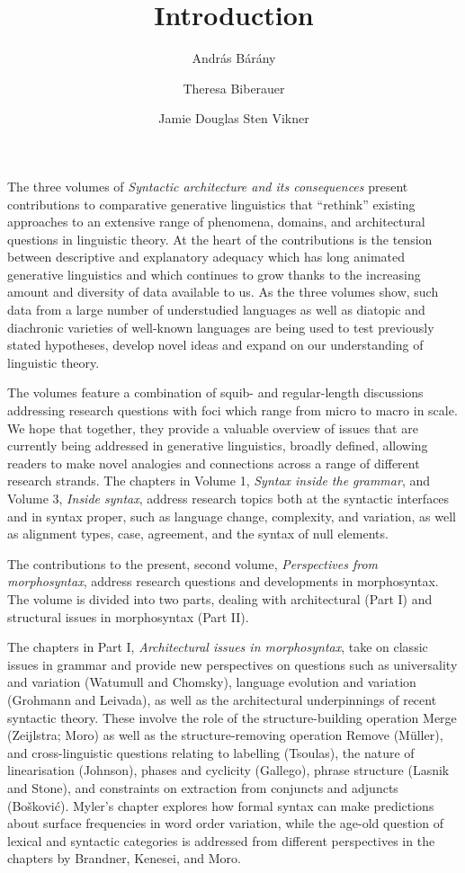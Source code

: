\documentclass[output=paper]{langsci/langscibook}
\author{András Bárány\affiliation{Bielefeld University}\and
        Theresa Biberauer\affiliation{University of Cambridge, Stellenbosch
        University, University of the West Cape}\and
        Jamie Douglas\affiliation{University of Cambridge}\lastand
        Sten Vikner\affiliation{Aarhus University}}
\title{Introduction}
\begin{document}
\maketitle

\noindent The three volumes of \emph{Syntactic architecture and its
consequences} present contributions to comparative generative linguistics that
\enquote{rethink} existing approaches to an extensive range of phenomena,
domains, and architectural questions in linguistic theory. At the heart of the
contributions is the tension between descriptive and explanatory adequacy which
has long animated generative linguistics and which continues to grow thanks to
the increasing amount and diversity of data available to us. As the three
volumes show, such data from a large number of understudied languages as well
as diatopic and diachronic varieties of well-known languages are being used to
test previously stated hypotheses, develop novel ideas and expand on our
understanding of linguistic theory.

The volumes feature a combination of squib- and regular-length discussions
addressing research questions with foci which range from micro to macro in
scale. We hope that together, they provide a valuable overview of issues that
are currently being addressed in generative linguistics, broadly defined,
allowing readers to make novel analogies and connections across a range of
different research strands. The chapters in Volume 1, \emph{Syntax inside the
grammar}, and Volume 3, \emph{Inside syntax}, address research topics both at
the syntactic interfaces and in syntax proper, such as language change,
complexity, and variation, as well as alignment types, case, agreement, and the
syntax of null elements.

The contributions to the present, second volume, \emph{Perspectives from
morphosyntax}, address research questions and developments in morphosyntax.
The volume is divided into two parts, dealing with architectural (Part I) and
structural issues in morphosyntax (Part II).

The chapters in Part I, \emph{Architectural issues in morphosyntax}, take on
classic issues in grammar and provide new perspectives on questions such as
universality and variation (Watumull and Chomsky), language evolution and
variation (Grohmann and Leivada), as well as the architectural underpinnings of
recent syntactic theory. These involve the role of the structure-building
operation Merge (Zeijlstra; Moro) as well as the structure-removing operation
Remove (Müller), and cross-linguistic questions relating to labelling
(Tsoulas), the nature of linearisation (Johnson), phases and cyclicity
(Gallego), phrase structure (Lasnik and Stone), and constraints on extraction
from conjuncts and adjuncts (Bošković). Myler’s chapter explores how formal
syntax can make predictions about surface frequencies in word order variation,
while the age-old question of lexical and syntactic categories is addressed
from different perspectives in the chapters by Brandner, Kenesei, and Moro.
\end{document}
